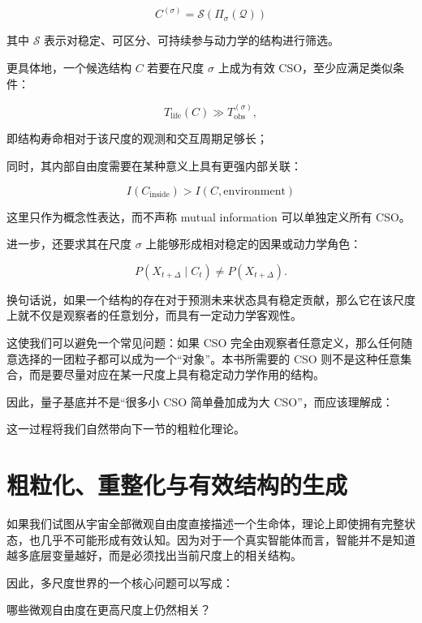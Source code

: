 \[
\boxed{
C^{(\sigma)}
=
\mathcal{S}
\left(
\Pi_{\sigma}(\mathcal{Q})
\right)
}
\]

其中 $\mathcal{S}$ 表示对稳定、可区分、可持续参与动力学的结构进行筛选。

更具体地，一个候选结构 $C$ 若要在尺度 $\sigma$ 上成为有效 CSO，至少应满足类似条件：

\[
T_{\mathrm{life}}(C)
\gg
T_{\mathrm{obs}}^{(\sigma)},
\]

即结构寿命相对于该尺度的观测和交互周期足够长；

同时，其内部自由度需要在某种意义上具有更强内部关联：

\[
I(C_{\mathrm{inside}})
>
I(C,\mathrm{environment})
\]

这里只作为概念性表达，而不声称 mutual information 可以单独定义所有 CSO。

进一步，还要求其在尺度 $\sigma$ 上能够形成相对稳定的因果或动力学角色：

\[
P
\left(
X_{t+\Delta}
\mid
C_t
\right)
\neq
P
\left(
X_{t+\Delta}
\right).
\]

换句话说，如果一个结构的存在对于预测未来状态具有稳定贡献，那么它在该尺度上就不仅是观察者的任意划分，而具有一定动力学客观性。

这使我们可以避免一个常见问题：如果 CSO 完全由观察者任意定义，那么任何随意选择的一团粒子都可以成为一个“对象”。本书所需要的 CSO 则不是这种任意集合，而是要尽量对应在某一尺度上具有稳定动力学作用的结构。

因此，量子基底并不是“很多小 CSO 简单叠加成为大 CSO”，而应该理解成：

\begin{statementbox}
\centering
{}
\end{statementbox}

这一过程将我们自然带向下一节的粗粒化理论。

\section{粗粒化、重整化与有效结构的生成}

如果我们试图从宇宙全部微观自由度直接描述一个生命体，理论上即使拥有完整状态，也几乎不可能形成有效认知。因为对于一个真实智能体而言，智能并不是知道越多底层变量越好，而是必须找出当前尺度上的相关结构。

因此，多尺度世界的一个核心问题可以写成：

\begin{statementbox}
哪些微观自由度在更高尺度上仍然相关？
\end{statementbox}

